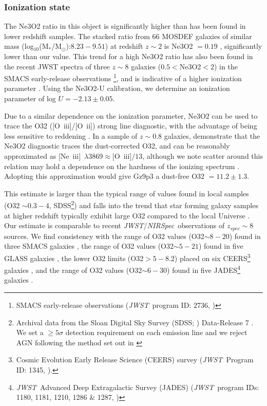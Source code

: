 \documentclass[sn-mathphys]{sn-jnl}%
\theoremstyle{thmstyleone}%
\theoremstyle{thmstyletwo}%
\theoremstyle{thmstylethree}%
\newcommand{\Oii}{[O~{\sc ii}]}
\newcommand{\Neiiia}{[Ne~{\sc iii}]~$\lambda$3869}
\newcommand{\Oiii}{[O~{\sc iii}]}
\newcommand{\jwst}{\textit{JWST}}
\newcommand{\NIRSpec}{\textit{NIRSpec}}
\begin{document}
\subsubsection{Ionization state} 
The Ne3O2 ratio in this object is significantly higher than has been found in lower redshift samples. The stacked ratio from 66 MOSDEF galaxies of similar mass (log$_{10}$(M$_*/$M$_\odot$):$8.23-9.51$) at redshift $z\sim2$ is Ne3O2 $=0.19$ \citep{Jeong20}, significantly lower than our value. This trend for a high Ne3O2 ratio has also been found in the recent JWST spectra of three $z\sim8$ galaxies ($0.5<$Ne3O2$<2$) in the SMACS early-release observations \citep{Katz23, Curti23}\footnote{SMACS early-release observations (\jwst\ program ID: 2736, \cite{Pontoppidan22})}, and is indicative of a higher ionization parameter \citep{Levesque14}. Using the \cite{Witstok21} Ne3O2-U calibration, we determine an ionization parameter of log $U=-2.13\pm0.05$.

Due to a similar dependence on the ionization parameter, Ne3O2 can be used to trace the O32 (\Oiii/\Oii) strong line diagnostic, with the advantage of being less sensitive to reddening \citep{Jones15, Levesque14, Paalvast18, Witstok21}. In a sample of $z\sim0.8$ galaxies, \cite{Jones15} demonstrate that the Ne3O2 diagnostic traces the dust-corrected O32, and can be reasonably approximated as \Neiiia$\approx$\Oiii$/13$, although we note scatter around this relation may hold a dependence on the hardness of the ionizing spectrum \cite{Strom_2017, Zeimann15}. Adopting this approximation would give Gz9p3 a dust-free O32 $=11.2\pm1.3$.

This estimate is larger than the typical range of values found in local samples (O32 $\sim0.3-4$, SDSS\footnote{Archival data from the Sloan Digital Sky Survey (SDSS; \cite{York00}) Data-Release 7 \citep{Abazajian09}. We set a $\geq5\sigma$ detection requirement on each emission line and we reject AGN following the method set out in \cite{Runco21}}) and falls into the trend that star forming galaxy samples at higher redshift typically exhibit large O32 compared to the local Universe \cite[e.g.,][]{Sanders23, Strom_2017, Runco21}.
Our estimate is comparable to recent \jwst/\NIRSpec\ observations of $z_{spec}\sim8$ sources. 
We find consistency with the range of O32 values (O32$\sim8-20$) found in three SMACS galaxies \citep{Katz23, Curti23}, the range of O32 values (O32$\sim5-21$) found in five GLASS galaxies \citep{Mascia23}, the lower O32 limits (O32$>5-8.2$) placed on six CEERS\footnote{Cosmic Evolution Early Release Science (CEERS)
survey (\jwst\ Program ID: 1345, \cite{Finkelstein22}).} galaxies  \citep{Fujimoto23}, and the range of O32 values (O32$\sim6-30$) found in five JADES\footnote{\jwst\ Advanced Deep Extragalactic Survey (JADES) (\jwst\ program IDs: 1180, 1181, 1210, 1286 $\&$ 1287, \cite{Eisenstein23})} galaxies \citep{Cameron23}. 
\end{document}
